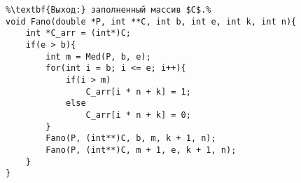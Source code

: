 \begin{lstlisting}[escapechar=\%]
%\noindent\textbf{Вход:} $b$ - индекс начала обрабатываемой части массива $P$, $e$ - индекс конца обрабатываемой части $P$, $k$ - длина уже постоенных кодов в обрабтываемой части массива $C$.\\%
%\textbf{Выход:} заполненный массив $C$.%
void Fano(double *P, int **C, int b, int e, int k, int n){
	int *C_arr = (int*)C;
	if(e > b){
		int m = Med(P, b, e);
		for(int i = b; i <= e; i++){
			if(i > m)
				C_arr[i * n + k] = 1;
			else
				C_arr[i * n + k] = 0;
		}
		Fano(P, (int**)C, b, m, k + 1, n);
		Fano(P, (int**)C, m + 1, e, k + 1, n);
	}
}
\end{lstlisting}

